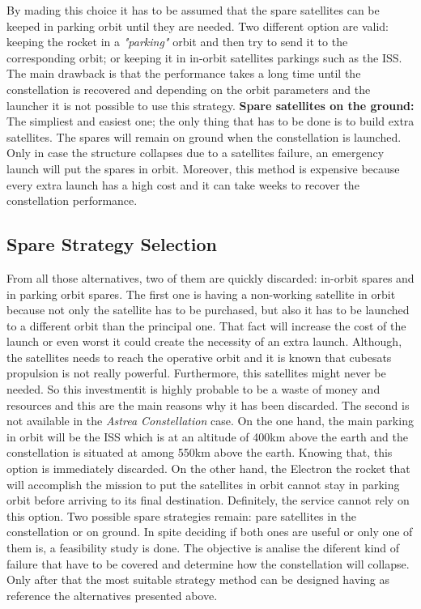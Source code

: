 By mading this choice it has to be assumed that the spare satellites can be keeped in parking orbit until they are needed. Two different option are valid: keeping the rocket in a \textit{"parking"} orbit and then try to send it to the corresponding orbit; or keeping it in in-orbit satellites parkings such as the ISS. The main drawback is that the performance takes a long time until the constellation is recovered and depending on the orbit parameters and the launcher it is not possible to use this strategy.  
\newline
\newline
\textbf{Spare satellites on the ground:}
\newline
The simpliest and easiest one; the only thing that has to be done is to build extra satellites. The spares will remain on ground when the constellation is launched. Only in case the structure collapses due to a satellites failure, an emergency launch will put the spares in orbit. Moreover, this method is expensive because every extra launch has a high cost and it can take weeks to recover the constellation performance. 
\newline
\subsection{Spare Strategy Selection}
From all those alternatives, two of them  are quickly discarded: in-orbit spares and in parking orbit spares. The first one is having a non-working satellite in orbit because not only the satellite has to be purchased, but also it has to be launched to a different orbit than the principal one. That fact will increase the cost of the launch or even worst it could create the necessity of an extra launch. Although, the satellites needs to reach the operative orbit and it is known that cubesats propulsion is not really powerful. Furthermore, this satellites might never be needed. So this investmentit is highly probable to be a waste of money and resources and this are the main reasons why it has been discarded.
\newline
\newline
The second is not available in the \textit{Astrea Constellation} case. On the one hand, the main parking in orbit will be the ISS which is at an altitude of 400km above the earth and the constellation is situated at among 550km above the earth. Knowing that, this option is immediately discarded. On the other hand, the Electron the rocket that will accomplish the mission to put the satellites in orbit cannot stay in parking orbit before arriving to its final destination. Definitely, the service cannot rely on this option.
\newline
\newline
Two possible spare strategies remain: pare satellites in the constellation or on ground. In spite deciding if both ones are useful or only one of them is, a feasibility study is done. The objective is analise the diferent kind of failure that have to be covered and determine how the constellation will collapse. Only after that the most suitable strategy method can be designed having as reference the alternatives presented above. 

